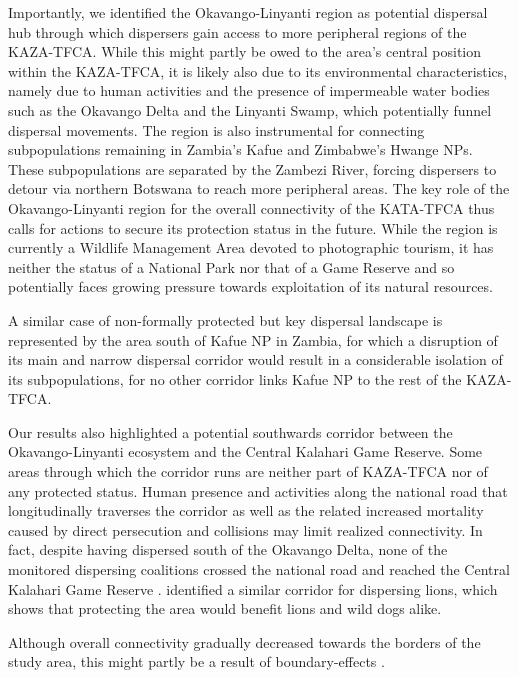 \documentclass[abstract=on,10pt,a4paper,bibliography=totocnumbered]{scrartcl}
\begin{document}
Importantly, we identified the Okavango-Linyanti region as potential dispersal
hub through which dispersers gain access to more peripheral regions of the
KAZA-TFCA. While this might partly be owed to the area's central position within
the KAZA-TFCA, it is likely also due to its environmental characteristics,
namely due to human activities and the presence of impermeable water bodies such
as the Okavango Delta and the Linyanti Swamp, which potentially funnel dispersal
movements. The region is also instrumental for connecting subpopulations
remaining in Zambia’s Kafue and Zimbabwe’s Hwange NPs. These subpopulations are
separated by the Zambezi River, forcing dispersers to detour via northern
Botswana to reach more peripheral areas. The key role of the Okavango-Linyanti
region for the overall connectivity of the KATA-TFCA thus calls for actions to
secure its protection status in the future. While the region is currently a
Wildlife Management Area devoted to photographic tourism, it has neither the
status of a National Park nor that of a Game Reserve and so potentially faces
growing pressure towards exploitation of its natural resources.

A similar case of non-formally protected but key dispersal landscape is
represented by the area south of Kafue NP in Zambia, for which a disruption of
its main and narrow dispersal corridor would result in a considerable isolation
of its subpopulations, for no other corridor links Kafue NP to the rest of the
KAZA-TFCA.

Our results also highlighted a potential southwards corridor between the
Okavango-Linyanti ecosystem and the Central Kalahari Game Reserve. Some areas
through which the corridor runs are neither part of KAZA-TFCA nor of any
protected status. Human presence and activities along the national road that
longitudinally traverses the corridor as well as the related increased
mortality caused by direct persecution and collisions \citep{Cozzi.2020} may
limit realized connectivity. In fact, despite having dispersed south of the
Okavango Delta, none of the monitored dispersing coalitions crossed the national
road and reached the Central Kalahari Game Reserve \citep{Cozzi.2020}.
\citep{Elliot.2014} identified a similar corridor for dispersing lions, which
shows that protecting the area would benefit lions and wild dogs alike.

Although overall connectivity gradually decreased towards the borders of the
study area, this might partly be a result of boundary-effects \citep{Koen.2010}.
\end{document}
